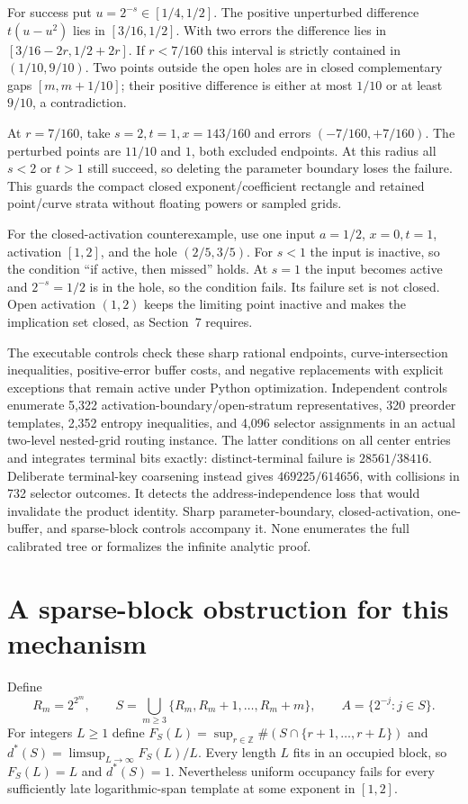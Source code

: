 \documentclass[11pt,letterpaper]{article}
\newcommand{\Z}{\mathbb Z}
\begin{document}
For success put $u=2^{-s}\in[1/4,1/2]$. The positive unperturbed difference
$t(u-u^2)$ lies in $[3/16,1/2]$. With two errors the difference lies in
$[3/16-2r,1/2+2r]$. If $r<7/160$ this interval is strictly contained in
$(1/10,9/10)$. Two points outside the open holes are in closed complementary
gaps $[m,m+1/10]$; their positive difference is either at most $1/10$ or at
least $9/10$, a contradiction.

At $r=7/160$, take $s=2,t=1,x=143/160$ and errors $(-7/160,+7/160)$.
The perturbed points are $11/10$ and $1$, both excluded endpoints. At this radius
all $s<2$ or $t>1$ still succeed, so deleting the parameter boundary loses the
failure. This guards the compact closed exponent/coefficient rectangle and
retained point/curve strata without floating powers or sampled grids.

For the closed-activation counterexample, use one input $a=1/2$, $x=0,t=1$,
activation $[1,2]$, and the hole $(2/5,3/5)$. For $s<1$ the input is inactive,
so the condition ``if active, then missed'' holds. At $s=1$ the input becomes
active and $2^{-s}=1/2$ is in the hole, so the condition fails. Its failure set
is not closed. Open activation $(1,2)$ keeps the limiting point inactive and
makes the implication set closed, as Section~7 requires.

The executable controls check these sharp rational endpoints, curve-intersection
inequalities, positive-error buffer costs, and negative replacements with
explicit exceptions that remain active under Python optimization. Independent
controls enumerate 5,322 activation-boundary/open-stratum representatives,
320 preorder templates, 2,352 entropy inequalities, and 4,096 selector
assignments in an actual two-level nested-grid routing instance. The latter
conditions on all center entries and integrates terminal bits exactly:
distinct-terminal failure is $28561/38416$. Deliberate terminal-key coarsening
instead gives $469225/614656$, with collisions in 732 selector outcomes.
It detects the address-independence loss that would invalidate the product
identity. Sharp parameter-boundary, closed-activation, one-buffer, and
sparse-block controls accompany it. None enumerates the full calibrated tree
or formalizes the infinite analytic proof.

\section{A sparse-block obstruction for this mechanism}
Define
\[
 R_m=2^{2^m},\qquad
 S=\bigcup_{m\ge3}\{R_m,R_m+1,\ldots,R_m+m\},\qquad
 A=\{2^{-j}:j\in S\}.
\]
For integers $L\ge1$ define
$F_S(L)=\sup_{r\in\Z}\#(S\cap\{r+1,\ldots,r+L\})$ and
$d^*(S)=\limsup_{L\to\infty}F_S(L)/L$.
Every length $L$ fits in an occupied block, so $F_S(L)=L$ and $d^*(S)=1$.
Nevertheless uniform occupancy fails for every sufficiently late logarithmic-span
template at some exponent in $[1,2]$.
\end{document}
